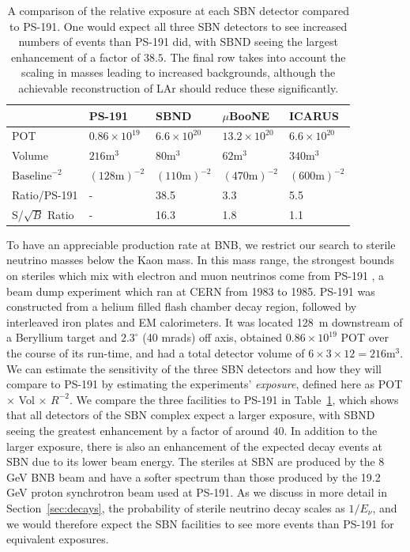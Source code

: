 \documentclass[11pt, a4paper]{article}
\newcommand{\refsec}[1]{Section~\ref{#1}}
\newcommand{\reftab}[1]{Table~\ref{#1}}
\begin{document}
\begin{table}[t!]
\centering
\begin{tabular}{| l || l | l | l | l |}
	\hline
	& PS-191 & SBND & $\mu$BooNE & ICARUS \\ \hline \hline
	POT	& $0.86 \times 10^{19}$	& $6.6 \times 10^{20}$	&	$13.2 \times 10^{20}$     &  $6.6 \times 10^{20}$ \\ \hline
	Volume	& $216\text{m}^3$	&	$80\text{m}^3$	&	$62\text{m}^3$	     &   $340\text{m}^3$	\\ \hline
	$\text{Baseline}^{-2}$	& $(128 	\text{m} )^{-2}$	&$(110 \text{m} )^{-2}$	&	$(470 \text{m} )^{-2}$			     & $(600 \text{m} )^{-2}$	  \\ \hline
Ratio/PS-191 & - 	& 38.5 	& 3.3	& 5.5\\ \hline
	S/$\sqrt{B}$ Ratio & - 	& 16.3 	& 1.8	& 1.1\\ \hline
\end{tabular}

\caption{\label{tab:exposure} A comparison of the relative exposure at each SBN detector
compared to PS-191. One would expect all  three SBN detectors to see increased
numbers of events than PS-191 did, with SBND seeing the largest enhancement of a
factor of $38.5$. The final row takes into account the scaling in masses
leading to increased backgrounds, although the achievable reconstruction of LAr
should reduce these significantly.}

\end{table}

To have an appreciable production rate at BNB, we restrict our search to
sterile neutrino masses below the Kaon mass. In this mass range, the strongest
bounds on steriles which mix with electron and muon neutrinos come from PS-191
\cite{Bernardi:1985ny,Bernardi:1987ek}, a beam dump experiment which ran at
CERN from 1983 to 1985. 
%
PS-191 was constructed from a helium filled flash chamber decay region,
followed by interleaved iron plates and EM calorimeters. It was located 128~m
downstream of a Beryllium target and $2.3^\circ$ (40 mrads) off axis, obtained
$0.86 \times 10^{19}$ POT over the course of its run-time, and had a total
detector volume of $6\times3\times12 = 216 \text{m}^3$. We can estimate the
sensitivity of the three SBN detectors and how they will compare to PS-191 by
estimating the experiments' \emph{exposure}, defined here as POT $\times$ Vol
$\times$ $R^{-2}$. We compare the three facilities to PS-191 in
\reftab{tab:exposure}, which shows that all detectors of the SBN complex expect
a larger exposure, with SBND seeing the greatest enhancement by a factor of
around $40$. 
%
In addition to the larger exposure, there is also an enhancement of the
expected decay events at SBN due to its lower beam energy. The steriles at SBN
are produced by the 8 GeV BNB beam and have a softer spectrum than those
produced by the 19.2 GeV proton synchrotron beam used at PS-191. As we discuss
in more detail in \refsec{sec:decays}, the probability of sterile neutrino
decay scales as $1/E_\nu$, and we would therefore expect the SBN facilities to
see more events than PS-191 for equivalent exposures.
\end{document}
